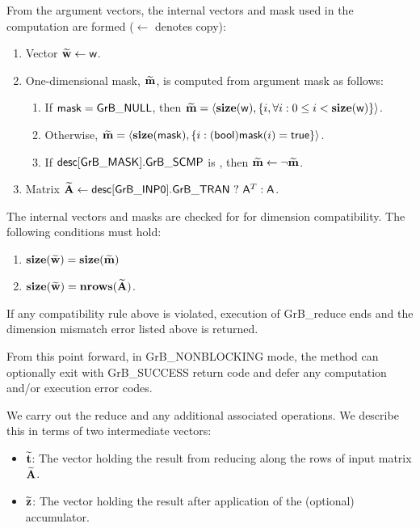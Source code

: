 From the argument vectors, the internal vectors and mask used in 
the computation are formed ($\leftarrow$ denotes copy):
\begin{enumerate}
	\item Vector ${\bf \widetilde{w}} \leftarrow {\sf w}$.

	\item One-dimensional mask, ${\bf \widetilde{m}}$, is computed from 
    argument {\sf mask} as follows:
	\begin{enumerate}
		\item	If ${\sf mask} = {\sf GrB\_NULL}$, then ${\bf \widetilde{m}} = 
        \langle \bold{size}({\sf w}), \{i, \forall i : 0 \leq i < 
        \bold{size}({\sf w}) \} \rangle$.

		\item	Otherwise, ${\bf \widetilde{m}} = 
        \langle \bold{size}({\sf mask}), \{i : ({\sf bool}){\sf mask}(i) = 
        {\sf true}\} \rangle$.

		\item	If ${\sf desc[GrB\_MASK].GrB\_SCMP}$ is \true, then 
        ${\bf \widetilde{m}} \leftarrow \neg {\bf \widetilde{m}}$.
	\end{enumerate}

	\item Matrix ${\bf \widetilde{A}} \leftarrow 
    {\sf desc[GrB\_INP0].GrB\_TRAN} \ ? \ {\sf A}^T : {\sf A}$.
    
\end{enumerate}

The internal vectors and masks are checked for for dimension compatibility. 
The following conditions must hold:
\begin{enumerate}
	\item $\bold{size}({\bf \widetilde{w}}) = \bold{size}({\bf \widetilde{m}})$
	\item $\bold{size}({\bf \widetilde{w}}) = \bold{nrows}({\bf \widetilde{A}})$.
\end{enumerate}
If any compatibility rule above is violated, execution of {\sf GrB\_reduce} ends and 
the dimension mismatch error listed above is returned.

From this point forward, in {\sf GrB\_NONBLOCKING} mode, the method can optionally exit
with {\sf GrB\_SUCCESS} return code and defer any computation and/or execution error codes.

We carry out the reduce and any additional 
associated operations.  We describe this in terms of two intermediate vectors:
\begin{itemize}
	\item ${\bf \widetilde{t}}$: The vector holding the result from reducing along the rows of input matrix
    ${\bf \widetilde{A}}$.
	\item ${\bf \widetilde{z}}$: The vector holding the result after 
    application of the (optional) accumulator.
\end{itemize}

